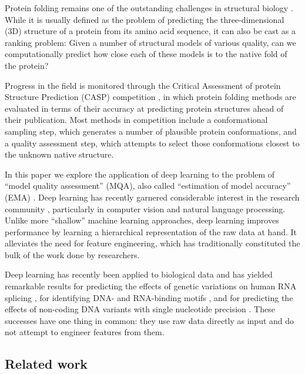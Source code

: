 

Protein folding remains one of the outstanding challenges in
structural biology \cite{dill2012folding}. While it is usually defined
as the problem of predicting the three-dimensional (3D) structure of a
protein from its amino acid sequence, it can also be cast as a ranking
problem: Given a number of structural models of various quality, can
we computationally predict how close each of these models is to the
native fold of the protein?

Progress in the field is monitored through the Critical Assessment of
protein Structure Prediction (CASP) competition \cite{moult1995large},
in which protein folding methods are evaluated in terms of their
accuracy at predicting protein structures ahead of their
publication. Most methods in competition include a conformational
sampling step, which generates a number of plausible protein
conformations, and a quality assessment step, which attempts to select
those conformations closest to the unknown native structure.

In this paper we explore the application of deep learning to the
problem of ``model quality assessment'' (MQA), also called
``estimation of model accuracy'' (EMA) \cite{kryshtafovych2015}. Deep
learning has recently garnered considerable interest in the research
community \cite{lecun2015deep}, particularly in computer vision and
natural language processing. Unlike more ``shallow'' machine learning
approaches, deep learning improves performance by learning a
hierarchical representation of the raw data at hand. It alleviates the
need for feature engineering, which has traditionally constituted the
bulk of the work done by researchers.

Deep learning has recently been applied to biological data and has
yielded remarkable results for predicting the effects of genetic
variations on human RNA splicing \cite{xiong2015human}, for
identifying DNA- and RNA-binding
motifs \cite{alipanahi2015predicting}, and for predicting the effects
of non-coding DNA variants with single nucleotide
precision \cite{zhou2015predicting}. These successes have one thing in
common: they use raw data directly as input and do not attempt to
engineer features from them.

\subsection{Related work}

